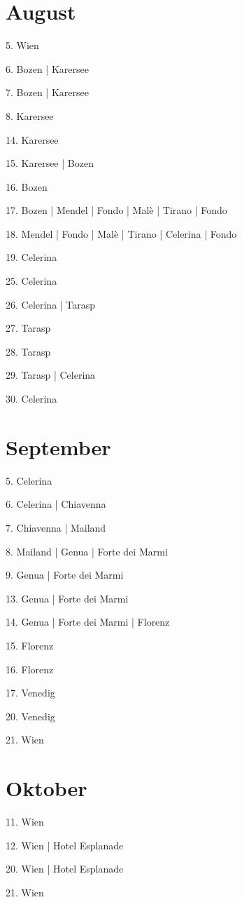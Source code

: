 \documentclass[twoside=false,titlepage=false,open=any, parskip=never, fontsize=10pt, headings=small, chapterprefix=false, appendixprefix=false, DIV=15]{scrbook}
\begin{document}
\begin{multicols}{3}
            \section*{August}
            5. Wien\par
            6. Bozen | Karersee\par
            7. Bozen | Karersee\par
            8. Karersee\par
            14. Karersee\par
            15. Karersee | Bozen\par
            16. Bozen\par
            17. Bozen | Mendel | Fondo | Malè | Tirano | Fondo\par
            18. Mendel | Fondo | Malè | Tirano | Celerina | Fondo\par
            19. Celerina\par
            25. Celerina\par
            26. Celerina | Tarasp\par
            27. Tarasp\par
            28. Tarasp\par
            29. Tarasp | Celerina\par
            30. Celerina\par
            \section*{September}
            5. Celerina\par
            6. Celerina | Chiavenna\par
            7. Chiavenna | Mailand\par
            8. Mailand | Genua | Forte dei Marmi\par
            9. Genua | Forte dei Marmi\par
            13. Genua | Forte dei Marmi\par
            14. Genua | Forte dei Marmi | Florenz\par
            15. Florenz\par
            16. Florenz\par
            17. Venedig\par
            20. Venedig\par
            21. Wien\par
            \section*{Oktober}
            11. Wien\par
            12. Wien | Hotel Esplanade\par
            20. Wien | Hotel Esplanade\par
            21. Wien\par

\end{multicols}
\end{document}
